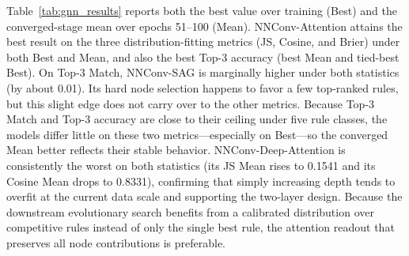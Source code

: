 \documentclass[pdflatex,iicol,Numbered,sn-basic]{sn-jnl}
\begin{document}
Table~\ref{tab:gnn_results} reports both the best value over training (Best) and the converged-stage mean over epochs 51--100 (Mean). NNConv-Attention attains the best result on the three distribution-fitting metrics (JS, Cosine, and Brier) under both Best and Mean, and also the best Top-3 accuracy (best Mean and tied-best Best).
On Top-3 Match, NNConv-SAG is marginally higher under both statistics (by about 0.01). Its hard node selection happens to favor a few top-ranked rules, but this slight edge does not carry over to the other metrics.
Because Top-3 Match and Top-3 accuracy are close to their ceiling under five rule classes, the models differ little on these two metrics—especially on Best—so the converged Mean better reflects their stable behavior.
NNConv-Deep-Attention is consistently the worst on both statistics (its JS Mean rises to 0.1541 and its Cosine Mean drops to 0.8331), confirming that simply increasing depth tends to overfit at the current data scale and supporting the two-layer design.
Because the downstream evolutionary search benefits from a calibrated distribution over competitive rules instead of only the single best rule, the attention readout that preserves all node contributions is preferable.
\end{document}
